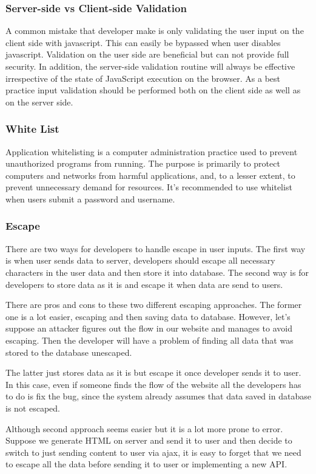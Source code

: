 \documentclass[conference]{IEEEtran}
\begin{document}
\subsubsection{Server-side vs Client-side Validation}
A common mistake that developer make is only validating the user input on the client side with javascript. This can easily be bypassed when user disables javascript. Validation on the user side are beneficial but can not provide full security. In addition, the server-side validation routine will always be effective irrespective of the state of JavaScript execution on the browser. As a best practice input validation should be performed both on the client side as well as on the server side.


\subsubsection{White List}
Application whitelisting is a computer administration practice used to prevent unauthorized programs from running. The purpose is primarily to protect computers and networks from harmful applications, and, to a lesser extent, to prevent unnecessary demand for resources\cite{whitelist}. It's recommended to use whitelist when users submit a password and username.


\subsubsection{Escape}
There are two ways for developers to handle escape in user inputs. The first way is when user sends data to server, developers should escape all necessary characters in the user data and then store it into database. The second way is for developers to store data as it is and escape it when data are send to users.

There are pros and cons to these two different escaping approaches. The former one is a lot easier, escaping and then saving data to database. However, let's suppose an attacker figures out the flow in our website and manages to avoid escaping. Then the developer will have a problem of finding all data that was stored to the database unescaped.

The latter just stores data as it is but escape it once developer sends it to user. In this case, even if someone finds the flow of the  website all the developers has to do is fix the bug, since the system already assumes that data saved in database is not escaped.

Although second approach seems easier but it is a lot more prone to error. Suppose we generate HTML on server and send it to user and then decide to switch to just sending content to user via ajax, it is easy to forget that we need to escape all the data before sending it to user or implementing a new API.
\end{document}
